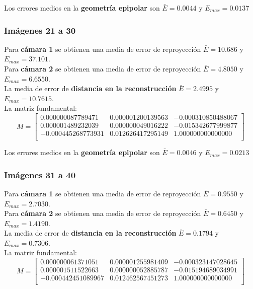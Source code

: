 \documentclass[a4paper, fontsize=11pt]{scrartcl} %
\numberwithin{equation}{section} %
\numberwithin{figure}{section} %
\numberwithin{table}{section} %
\begin{document}
	Los errores medios en la \textbf{geometría epipolar} son $\bar{E} = 0.0044$ y $E_{max} = 0.0137$
	
	\subsubsection*{Imágenes 21 a 30}
	
	Para \textbf{cámara 1} se obtienen una media de error de reproyección $\bar{E} = 10.686$ y $E_{max} = 37.101$.\\
	Para \textbf{cámara 2} se obtienen una media de error de reproyección $\bar{E} = 4.8050$ y $E_{max} = 6.6550$.\\
	
	La media de error de \textbf{distancia en la reconstrucción} $\bar{E} = 2.4995$ y $E_{max} = 10.7615$.\\
	La matriz fundamental:
	\[
	M=
	\begin{bmatrix}
	0.000000087789471&	0.000001200139563&	-0.000310850488067 \\
	0.000001489232039&	0.000000049016222&	-0.015342677999877 \\
	-0.000445268773931&	0.012626417295149&	1.000000000000000  \\
	
	\end{bmatrix}
	\]
	
	Los errores medios en la \textbf{geometría epipolar} son $\bar{E} = 0.0046$ y $E_{max} = 0.0213$
	
	\subsubsection*{Imágenes 31 a 40}
	
	Para \textbf{cámara 1} se obtienen una media de error de reproyección $\bar{E} = 0.9550$ y $E_{max} = 2.7030$.\\
	Para \textbf{cámara 2} se obtienen una media de error de reproyección $\bar{E} = 0.6450$ y $E_{max} = 1.4190$.\\
	
	La media de error de \textbf{distancia en la reconstrucción} $\bar{E} = 0.1794$ y $E_{max} = 0.7306$.\\
	La matriz fundamental:
	\[
	M=
	\begin{bmatrix}
	0.000000061371051&	0.000001255981409&	-0.000323147028645 \\
	0.000001511522663&	0.000000052885787&	-0.015194689034991 \\
	-0.000442451089967&	0.012462567451273&	1.000000000000000  \\
	
	\end{bmatrix}
	\]
	
\end{document}

